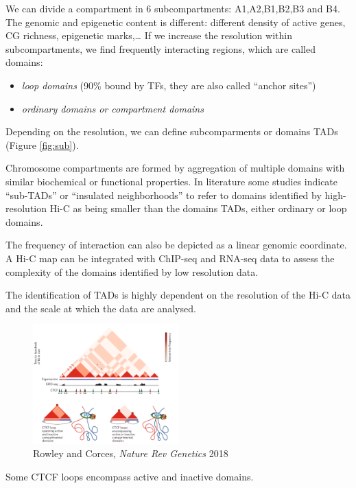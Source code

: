 We can divide a compartment in 6 subcompartments: A1,A2,B1,B2,B3 and B4. The genomic and epigenetic content is different: different density of active genes, CG richness, epigenetic marks,\ldots{} If we increase the resolution within subcompartments, we find frequently interacting regions, which are called domains:

\begin{itemize}
\tightlist
\item
  \emph{loop domains} (90\% bound by TFs, they are also called ``anchor sites'')
\item
  \emph{ordinary domains or compartment domains}
\end{itemize}

Depending on the resolution, we can define subcomparments or domains TADs (Figure \ref{fig:sub}).

Chromosome compartments are formed by aggregation of multiple domains with similar biochemical or functional properties. In literature some studies indicate ``sub-TADs'' or ``insulated neighborhoods'' to refer to domains identified by high-resolution Hi-C as being smaller than the domains TADs, either ordinary or loop domains.

The frequency of interaction can also be depicted as a linear genomic coordinate. A Hi-C map can be integrated with ChIP-seq and RNA-seq data to assess the complexity of the domains identified by low resolution data.

The identification of TADs is highly dependent on the resolution of the Hi-C data and the scale at which the data are analysed.

\begin{figure}
\centering
\includegraphics[width=0.5\textwidth]{../_resources/Screenshot_2022-10-19_at_09-20-57.png}
\caption{Rowley and Corces, \emph{Nature Rev Genetics} 2018}
\end{figure}

Some CTCF loops encompass active and inactive domains.

